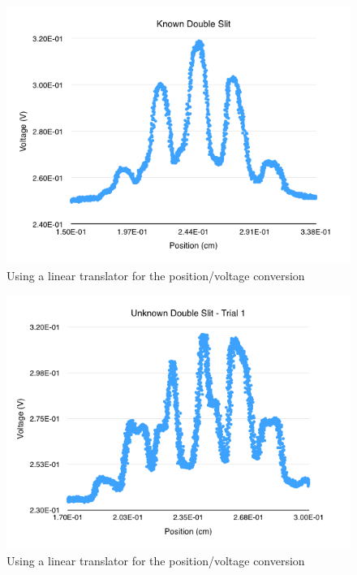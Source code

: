 \documentclass{article}
\begin{document}
\begin{figure}[H]
    \centering
    \includegraphics[width=\textwidth]{charts/known}
    \caption{Using a linear translator for the position/voltage conversion}
    \label{known}
\end{figure}

\begin{figure}[H]
    \centering
    \includegraphics[width=\textwidth]{charts/unknown1}
    \caption{Using a linear translator for the position/voltage conversion}
    \label{unknown1}
\end{figure}
\end{document}
